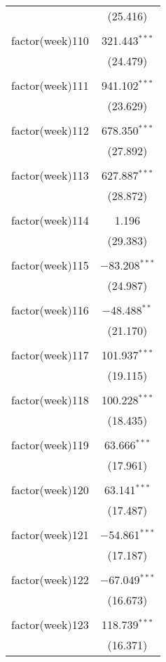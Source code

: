 \documentclass{article}
\begin{document}
\begin{table}[!htbp]
\begin{tabular}{@{\extracolsep{5pt}}lc}
  & (25.416) \\ 
  & \\ 
 factor(week)110 & 321.443$^{***}$ \\ 
  & (24.479) \\ 
  & \\ 
 factor(week)111 & 941.102$^{***}$ \\ 
  & (23.629) \\ 
  & \\ 
 factor(week)112 & 678.350$^{***}$ \\ 
  & (27.892) \\ 
  & \\ 
 factor(week)113 & 627.887$^{***}$ \\ 
  & (28.872) \\ 
  & \\ 
 factor(week)114 & 1.196 \\ 
  & (29.383) \\ 
  & \\ 
 factor(week)115 & $-$83.208$^{***}$ \\ 
  & (24.987) \\ 
  & \\ 
 factor(week)116 & $-$48.488$^{**}$ \\ 
  & (21.170) \\ 
  & \\ 
 factor(week)117 & 101.937$^{***}$ \\ 
  & (19.115) \\ 
  & \\ 
 factor(week)118 & 100.228$^{***}$ \\ 
  & (18.435) \\ 
  & \\ 
 factor(week)119 & 63.666$^{***}$ \\ 
  & (17.961) \\ 
  & \\ 
 factor(week)120 & 63.141$^{***}$ \\ 
  & (17.487) \\ 
  & \\ 
 factor(week)121 & $-$54.861$^{***}$ \\ 
  & (17.187) \\ 
  & \\ 
 factor(week)122 & $-$67.049$^{***}$ \\ 
  & (16.673) \\ 
  & \\ 
 factor(week)123 & 118.739$^{***}$ \\ 
  & (16.371) \\ 

\end{tabular}
\end{table}
\end{document}
